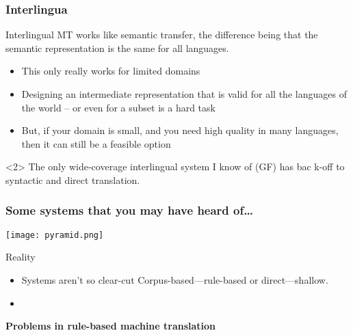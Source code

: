 \documentclass{beamer}
\begin{document}
\begin{frame}
  \frametitle{Interlingua}

Interlingual MT works like semantic transfer, the difference being 
that the semantic representation
is the same for all languages.

\begin{itemize}
  \item This only really works for limited domains
  \item Designing an intermediate representation that is valid for 
all the languages of the world --
    or even for a subset is a hard task
  \item But, if your domain is small, and you need high quality in 
many languages, then it can
    still be a feasible option
\end{itemize}

\begin{onlyenv}<2>
  The only wide-coverage interlingual system I know of (GF) has bac
k-off to 
   syntactic and direct translation.
\end{onlyenv}


\end{frame}

\begin{frame}
  \frametitle{Some systems that you may have heard of\ldots}

\begin{center}
\texttt{[image: pyramid.png]}
\end{center}

\end{frame}

\begin{frame}{Reality}
    \begin{itemize}
        \item Systems aren't so clear-cut Corpus-based---rule-based or
            direct---shallow.
        \item 
    \end{itemize}
\end{frame}

\begin{frame} %
 \begin{center}
 {\Large {\bf Problems in rule-based machine translation}}
 \end{center}
\end{frame}
\end{document}
